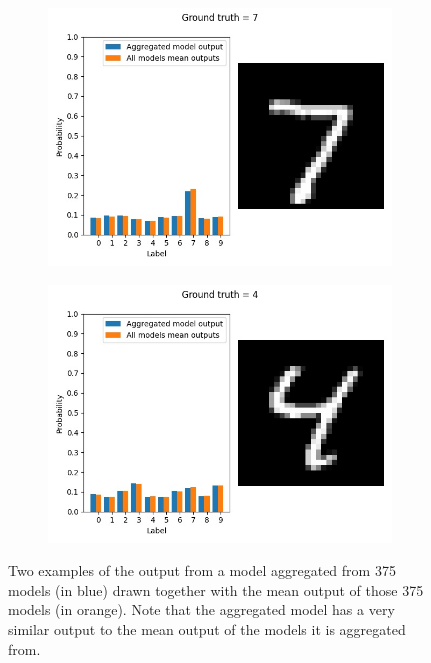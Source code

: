 \begin{figure}
    \begin{subfigure}{.5\textwidth}
        \centering
        \includegraphics[width=\linewidth]{figures/aggr-vs-mean-1.jpg}
        \caption{}
        \label{fig:aggr-vs-mean-a}
    \end{subfigure}
    \begin{subfigure}{.5\textwidth}
        \centering
        \includegraphics[width=\linewidth]{figures/aggr-vs-mean-2.jpg}
        \caption{}
        \label{fig:aggr-vs-mean-b}
    \end{subfigure}
    \caption{Two examples of the output from a model aggregated from 375 models (in blue) drawn together with the mean output of those 375 models (in orange). Note that the aggregated model has a very similar output to the mean output of the models it is aggregated from.}
    \label{fig:example-votes}
\end{figure} \label{fig:aggr-vs-mean}

